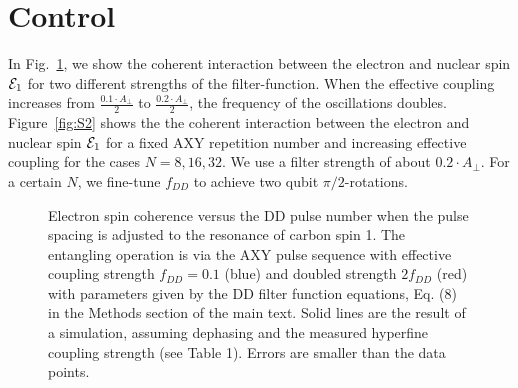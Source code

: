 \documentclass[aps,prl,floatfix,twocolumn,footinbib,superscriptaddress]{revtex4-1}
\begin{document}
\author{T. Unden}

\author{D. Louzon}

\author{M. Zwolak}

\author{W. H. Zurek}

\author{F. Jelezko}

\maketitle

\renewcommand\thefigure{S\arabic{figure}}

\section{Control}

In Fig.~\ref{fig:S1}, we show the coherent interaction between the electron and nuclear spin $\mathcal{E}_1$ for two different strengths of the filter-function. When the effective coupling increases from $\frac{0.1\cdot A_\perp}{2}$ to $\frac{0.2\cdot A_\perp}{2}$, the frequency of the oscillations doubles. Figure~\ref{fig:S2} shows the the coherent interaction between the electron and nuclear spin $\mathcal{E}_1$ for a fixed AXY repetition number and increasing effective coupling for the cases $N=8,16,32$. We use a filter strength of about $0.2\cdot A_\perp$. For a certain $N$, we fine-tune $f_{DD}$ to achieve two qubit $\pi/2$-rotations.

\begin{figure}[h]
\centerline{}
\caption{Electron spin coherence versus the DD pulse number when the pulse spacing is adjusted to the resonance of carbon spin 1. The entangling operation is via the AXY pulse sequence with effective coupling strength $f_{DD}=0.1$ (blue) and doubled strength $2f_{DD}$ (red) with parameters given by the DD filter function equations, Eq. (8) in the Methods section of the main text. Solid lines are the result of a simulation, assuming dephasing and the measured hyperfine coupling strength (see Table 1). Errors are smaller than the data points.}
\label{fig:S1}
\end{figure}
\end{document}
